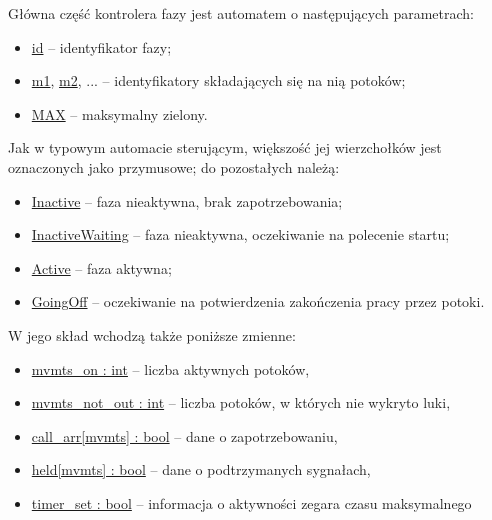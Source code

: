 \documentclass{pracamgr}
\theoremstyle{plain}
\begin{document}
Główna część kontrolera fazy jest automatem o następujących
parametrach:
\begin{itemize}
  \item \url{id} -- identyfikator fazy;
  \item \url{m1}, \url{m2}, ... -- identyfikatory składających się na
  nią potoków;
  \item \url{MAX} -- maksymalny zielony.
\end{itemize}
Jak w typowym automacie sterującym, większość jej wierzchołków jest
oznaczonych jako przymusowe; do pozostałych należą:
\begin{itemize}
  \item \url{Inactive} -- faza nieaktywna, brak zapotrzebowania;
  \item \url{InactiveWaiting} -- faza nieaktywna, oczekiwanie na
  polecenie startu;
  \item \url{Active} -- faza aktywna;
  \item \url{GoingOff} -- oczekiwanie na potwierdzenia zakończenia
  pracy przez potoki.
\end{itemize}
W jego skład wchodzą także poniższe zmienne:
\begin{itemize}
  \item \url{mvmts_on : int} -- liczba aktywnych potoków,
  \item \url{mvmts_not_out : int} -- liczba potoków, w których nie wykryto luki,
  \item \url{call_arr[mvmts] : bool} -- dane o zapotrzebowaniu,
  \item \url{held[mvmts] : bool} -- dane o podtrzymanych sygnałach,
  \item \url{timer_set : bool} -- informacja o aktywności zegara czasu
  maksymalnego
\end{itemize}
\end{document}

